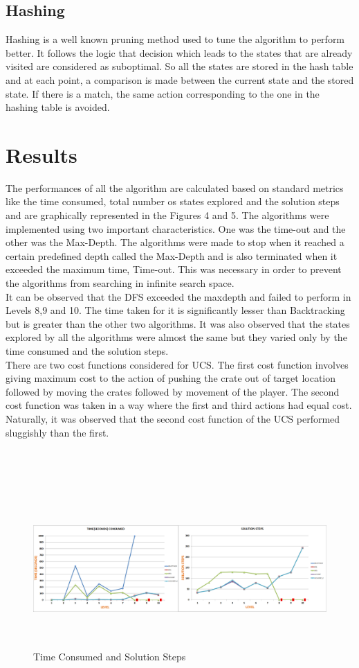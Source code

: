 \documentclass[10pt, final]{article}
\newcommand{\br}[1][.75]{\ \\[#1\baselineskip]}
\begin{document}
	\subsection{Hashing}
	Hashing is a well known pruning method used to tune the algorithm to perform better. It follows the logic that decision which leads to the states that are already visited are considered as suboptimal. So all the states are stored in the hash table and at each point, a comparison is made between the current state and the stored state. If there is a match, the same action corresponding to the one in the hashing table is avoided.
	\section{Results}
	The performances of all the algorithm are calculated based on standard metrics like the time consumed, total number os states explored and the solution steps and are graphically represented in the Figures 4 and 5. The algorithms were implemented using two important characteristics. One was the time-out and the other was the Max-Depth. The algorithms were made to stop when it reached a certain predefined depth called the Max-Depth and is also terminated when it exceeded the maximum time, Time-out. This was necessary in order to prevent the algorithms from searching in infinite search space.\br
	It can be observed that the DFS exceeded the maxdepth and failed to perform in Levels 8,9 and 10. The time taken for it is significantly lesser than Backtracking but is greater than the other two algorithms. It was also observed that the states explored by all the algorithms were almost the same but they varied only by the time consumed and the solution steps.\br 
	There are two cost functions considered for UCS. The first cost function involves giving maximum cost to the action of pushing the crate out of target location followed by moving the crates followed by movement of the player. The second cost function was taken in a way where the first and third actions had equal cost. Naturally, it was observed that the second cost function of the UCS performed sluggishly than the first. \br \br \br \br
\begin{figure}[h!]
		\centering
	\includegraphics[width=18cm, height=6cm]{pic5.png}
	\caption{Time Consumed and Solution Steps}
\end{figure}
\end{document}
